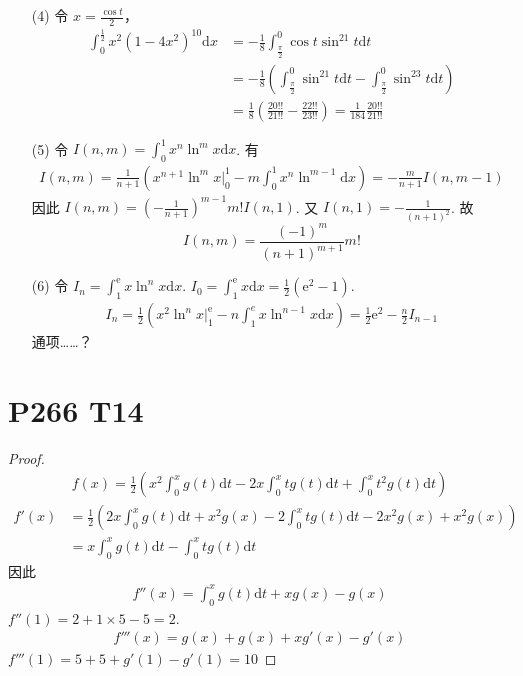 \documentclass{article}
\newcommand{\dd}{\mathrm{d}}
\newcommand{\dx}{\dd x}
\newcommand{\dt}{\dd t}
\newcommand{\ee}{\mathrm{e}}
\begin{document}
\begin{itemize}
    \item [(4)] 令 $x = \frac{\cos t }{2}$，
    \begin{align*}
        \int_{0}^{\frac{1}{2}}x^2(1 - 4x^2)^10\dx &= -\frac{1}{8}\int_{\frac{\pi}{2}}^{0} \cos t \sin^21 t \dt \\
        &= -\frac{1}{8}\left(\int_{\frac{\pi}{2}}^{0}\sin^21 t \dt - \int_{\frac{\pi}{2}}^{0} \sin^23 t \dt\right) \\
        &= \frac{1}{8}\left(\frac{20!!}{21!!} - \frac{22!!}{23!!}\right) = \frac{1}{184}\frac{20!!}{21!!}
    \end{align*}
    \item [(5)] 令 $I(n, m) = \int_{0}^{1}x^n\ln^m x\dx$. 有
    \begin{align*}
        I(n, m) = \frac{1}{n + 1}\left(x^{n + 1}\ln^m x \bigg|_0^1 - m\int_{0}^{1}x^n\ln^{m - 1}\dx\right) = -\frac{m}{n + 1}I(n, m - 1)
    \end{align*}
    因此 $I(n, m) = \left(-\frac{1}{n + 1}\right)^{m - 1}m!I(n, 1)$. 又 $I(n, 1) = -\frac{1}{(n + 1)^2}$. 故
    \[
        I(n, m) = \frac{(-1)^m}{(n + 1)^{m + 1}}m!
    \]
    \item [(6)] 令 $I_n = \int_{1}^{\ee} x\ln^n x \dx$. $I_0 = \int_{1}^{\ee}x\dx = \frac{1}{2}(\ee^2 - 1)$. 
    \begin{align*}
        I_n = \frac{1}{2}\left(x^2\ln^n x \bigg|_1^\ee - n\int_{1}^{e}x \ln^{n - 1}x \dx\right) = \frac{1}{2}\ee^2 - \frac{n}{2}I_{n - 1}
    \end{align*}
    通项……？
\end{itemize}

\section*{P266 T14}

\begin{proof}
    \begin{align*}
        f(x) = \frac{1}{2}\left(x^2\int_{0}^{x}g(t)\dt - 2x \int_{0}^{x}tg(t)\dt + \int_{0}^{x}t^2g(t)\dt\right)
    \end{align*}
    \begin{align*}
        f'(x) &= \frac{1}{2}\left(2x\int_{0}^{x}g(t)\dt + x^2 g(x) - 2\int_{0}^{x}tg(t)\dt - 2x^2g(x) + x^2g(x)\right) \\
        &= x\int_{0}^{x}g(t)\dt - \int_{0}^{x}tg(t)\dt
    \end{align*}
    因此
    \begin{align*}
        f''(x) = \int_{0}^{x}g(t)\dt + xg(x) - g(x)
    \end{align*}
    $f''(1) = 2 + 1 \times 5 - 5 = 2$.
    \begin{align*}
        f'''(x) = g(x) + g(x) + xg'(x) - g'(x)
    \end{align*}
    $f'''(1) = 5 + 5 + g'(1) - g'(1) = 10$
\end{proof}
\end{document}
